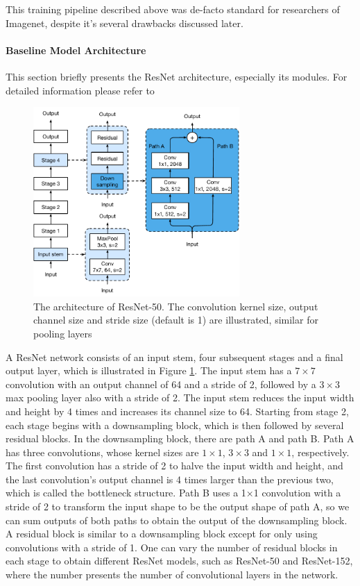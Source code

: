 This training pipeline described above was de-facto standard for researchers of Imagenet, despite it's several drawbacks discussed later. 

\paragraph{Baseline Model Architecture}
This section briefly presents the ResNet architecture, especially its modules. For detailed information please refer to \cite{he2016deep_resnetv1}


\begin{figure}[ht!]
    \centering
    \includegraphics[width=0.7\textwidth]{images/resnet-a.pdf}
    \caption{The architecture of ResNet-50. The convolution kernel size, output channel size and stride size (default is 1) are illustrated, similar for pooling layers}
    \label{fig: resnet-a}
  \end{figure}


A ResNet network consists of an input stem, four subsequent stages and a final output layer, which is illustrated in Figure \ref{fig: resnet-a}. The input stem has a $7 \times 7$ convolution with an output channel of 64 and a stride of 2, followed by a $3 \times 3$ max pooling layer also with a stride of 2. The input stem reduces the input width and height by 4 times and increases its channel size to 64. 
Starting from stage 2, each stage begins with a downsampling block, which is then followed by several residual blocks. In the downsampling block, there are path A and path B. Path A has three convolutions, whose kernel sizes are $1 \times 1$, $3 \times 3$ and $1 \times 1$, respectively. The first convolution has a stride of 2 to halve the input width and height, and the last convolution’s output channel is 4 times larger than the previous two, which is called the bottleneck structure. Path B uses a 1×1 convolution with a stride of 2 to transform the input shape to be the output shape of path A, so we can sum outputs of both paths to obtain the output of the downsampling block. A residual block is similar to a downsampling block except for only using convolutions with a stride of 1.
One can vary the number of residual blocks in each stage to obtain different ResNet models, such as ResNet-50 and ResNet-152, where the number presents the number of convolutional layers in the network.


